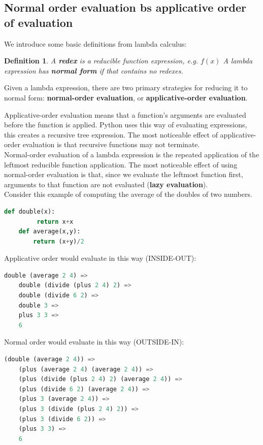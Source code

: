 \documentclass[a4paper,twoside]{article}
\newtheorem{definition}[theorem]{Definition}
\numberwithin{equation}{section}
\begin{document}
\subsection{Normal order evaluation bs applicative order of evaluation}

We introduce some basic definitions from lambda calculus:
\begin{definition}
A \textbf{redex} is a reducible function expression, e.g. $f(x)$ \newline
A lambda expression has \textbf{normal form} if that contains no redexes.
\end{definition}
Given a lambda expression, there are two primary strategies for reducing it to normal form:
\textbf{normal-order evaluation}, or \textbf{applicative-order evaluation}.

Applicative-order evaluation means that a function's arguments are evaluated before the function is
applied. Python uses this way of evaluating expressions, this creates a recursive tree expression.
The most noticeable effect of applicative-order evaluation is that recursive functions may not terminate.\\

Normal-order evaluation of a lambda expression is the repeated application of the leftmost
reducible function application. The most noticeable effect of using normal-order evaluation is that,
since we evaluate the leftmost function first, arguments to that function are not evaluated (\textbf{lazy evaluation}).\\
Consider this example of computing the average of the doubles of two numbers.
\begin{lstlisting}[language=Python]
    def double(x):
         return x+x
    def average(x,y):
        return (x+y)/2
\end{lstlisting}
Applicative order would evaluate in this way (INSIDE-OUT):
\begin{lstlisting}[language=Lisp]
    double (average 2 4) =>
    double (divide (plus 2 4) 2) =>
    double (divide 6 2) =>
    double 3 =>
    plus 3 3 =>
    6
\end{lstlisting}
Normal order would evaluate in this way (OUTSIDE-IN):
\begin{lstlisting}[language=Lisp]
    (double (average 2 4)) =>
    (plus (average 2 4) (average 2 4)) =>
    (plus (divide (plus 2 4) 2) (average 2 4)) =>
    (plus (divide 6 2) (average 2 4)) =>
    (plus 3 (average 2 4)) =>
    (plus 3 (divide (plus 2 4) 2)) =>
    (plus 3 (divide 6 2)) =>
    (plus 3 3) =>
    6
\end{lstlisting}
\end{document}
